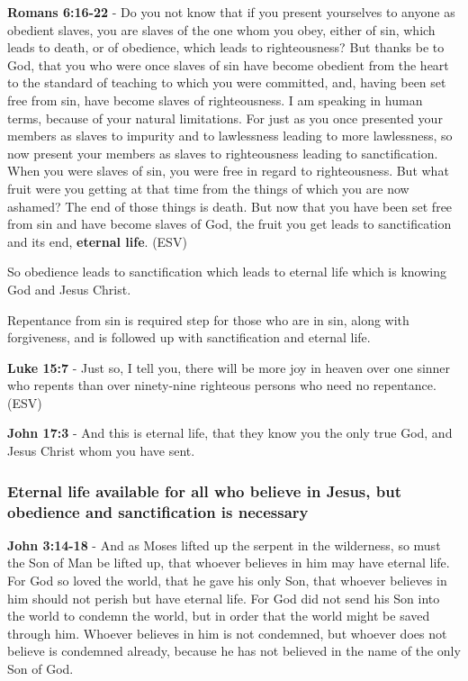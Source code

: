\documentclass[11pt]{article}
\begin{document}
\textbf{Romans 6:16-22} - Do you not know that if you present yourselves to anyone as obedient slaves, you are slaves of the one whom you obey, either of sin, which leads to death, or of obedience, which leads to righteousness? But thanks be to God, that you who were once slaves of sin have become obedient from the heart to the standard of teaching to which you were committed, and, having been set free from sin, have become slaves of righteousness. I am speaking in human terms, because of your natural limitations. For just as you once presented your members as slaves to impurity and to lawlessness leading to more lawlessness, so now present your members as slaves to righteousness leading to sanctification. When you were slaves of sin, you were free in regard to righteousness. But what fruit were you getting at that time from the things of which you are now ashamed? The end of those things is death. But now that you have been set free from sin and have become slaves of God, the fruit you get leads to sanctification and its end, \textbf{eternal life}. (ESV)

So obedience leads to sanctification which leads to eternal life which is knowing God and Jesus Christ.

Repentance from sin is required step for those who are in sin, along with forgiveness, and is followed up with sanctification and eternal life.

\textbf{Luke 15:7} - Just so, I tell you, there will be more joy in heaven over one sinner who repents than over ninety-nine righteous persons who need no repentance. (ESV)

\textbf{John 17:3} - And this is eternal life, that they know you the only true God, and Jesus Christ whom you have sent.

\subsubsection{Eternal life \textbf{available} for all who believe in Jesus, but obedience and sanctification is necessary}
\label{sec:orgdb6e1be}
\textbf{John 3:14-18} - And as Moses lifted up the serpent in the wilderness, so must the Son of Man be lifted up, that whoever believes in him may have eternal life. For God so loved the world, that he gave his only Son, that whoever believes in him should not perish but have eternal life. For God did not send his Son into the world to condemn the world, but in order that the world might be saved through him. Whoever believes in him is not condemned, but whoever does not believe is condemned already, because he has not believed in the name of the only Son of God.
\end{document}
